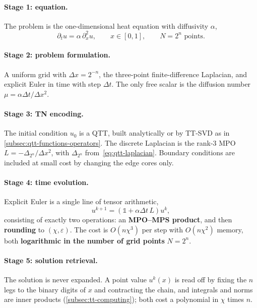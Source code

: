 \paragraph{Stage 1: equation.}
The problem is the one-dimensional heat equation with diffusivity $\alpha$,
\begin{equation}
  \partial_t u = \alpha\, \partial_x^2 u,
  \qquad x \in [0,1],
  \qquad N = 2^n \text{ points}.
  \label{eq:heat}
\end{equation}%

\paragraph{Stage 2: problem formulation.}
A uniform grid with $\Delta x = 2^{-n}$, the three-point finite-difference
Laplacian, and explicit Euler in time with step $\Delta t$. The only free
scalar is the diffusion number $\mu = \alpha \Delta t / \Delta x^2$.

\paragraph{Stage 3: TN encoding.}
The initial condition $u_0$ is a QTT, built analytically or by TT-SVD as in
\cref{subsec:qtt-functions-operators}. The discrete Laplacian is the rank-3
MPO $L = -\Delta_{2^n}/\Delta x^2$, with $\Delta_{2^n}$
from~\eqref{eq:qtt-laplacian}. Boundary conditions are included at small cost
by changing the edge cores only.

\paragraph{Stage 4: time evolution.}
Explicit Euler is a single line of tensor arithmetic,
\begin{equation}
  u^{k+1} = \left(\mathbb{1} + \alpha \Delta t\, L\right) u^{k},
  \label{eq:heat-explicit}
\end{equation}%
consisting of exactly two operations: an \textbf{MPO--MPS product}, and then
\textbf{rounding} to $(\chi,\varepsilon)$. The cost is $O(n\chi^3)$ per step
with $O(n\chi^2)$ memory, both \textbf{logarithmic in the number of grid
points} $N = 2^n$.

\paragraph{Stage 5: solution retrieval.}
The solution is never expanded. A point value $u^k(x)$ is read off by fixing the
$n$ legs to the binary digits of $x$ and contracting the chain, and integrals
and norms are inner products (\cref{subsec:tt-computing}); both cost a
polynomial in $\chi$ times $n$.

